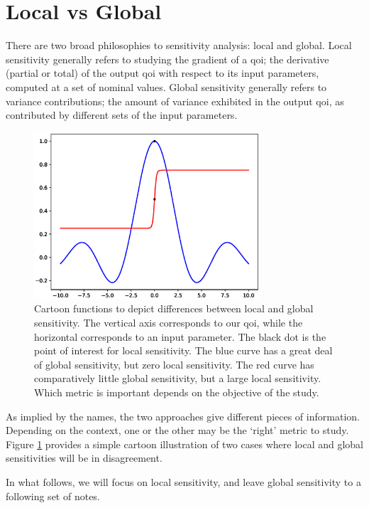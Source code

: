 \documentclass[../primer.tex]{subfiles}
\begin{document}
\section{Local vs Global}
\label{sec:org4eb0133}
There are two broad philosophies to sensitivity analysis: local and global.
Local sensitivity generally refers to studying the gradient of a qoi; the
derivative (partial or total) of the output qoi with respect to its input
parameters, computed at a set of nominal values. Global sensitivity generally
refers to variance contributions; the amount of variance exhibited in the output
qoi, as contributed by different sets of the input parameters.

\begin{figure}[!ht]
  \centering\includegraphics[width=0.75\textwidth]{./images/ex1}
  \caption{Cartoon functions to depict differences between local and global
  sensitivity. The vertical axis corresponds to our qoi, while the horizontal
  corresponds to an input parameter. The black dot is the point of interest
  for local sensitivity. The blue curve has a great deal of global sensitivity,
  but zero local sensitivity. The red curve has comparatively little global
  sensitivity, but a large local sensitivity. Which metric is important
  depends on the objective of the study.}
  \label{fig:ex1}
\end{figure}

As implied by the names, the two approaches give different pieces of
information. Depending on the context, one or the other may be the `right'
metric to study. Figure \ref{fig:ex1} provides a simple cartoon illustration of
two cases where local and global sensitivities will be in disagreement.

In what follows, we will focus on local sensitivity, and leave global
sensitivity to a following set of notes.
\end{document}
